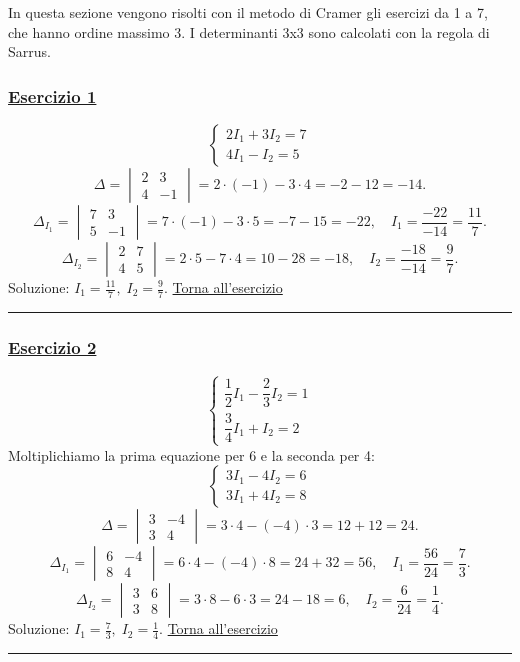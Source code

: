 In questa sezione vengono risolti con il metodo di Cramer gli esercizi da 1 a 7, che hanno ordine massimo 3. I determinanti 3x3 sono calcolati con la regola di Sarrus.

\subsubsection*{\hyperref[ex:1]{Esercizio 1}}
\[
\begin{cases}
2I_1 + 3I_2 = 7 \\
4I_1 - I_2 = 5
\end{cases}
\]
\[
\Delta = \begin{vmatrix} 2 & 3 \\ 4 & -1 \end{vmatrix} = 2\cdot(-1) - 3\cdot4 = -2-12 = -14.
\]
\[
\Delta_{I_1} = \begin{vmatrix} 7 & 3 \\ 5 & -1 \end{vmatrix} = 7\cdot(-1) - 3\cdot5 = -7-15 = -22,\quad I_1 = \frac{-22}{-14} = \frac{11}{7}.
\]
\[
\Delta_{I_2} = \begin{vmatrix} 2 & 7 \\ 4 & 5 \end{vmatrix} = 2\cdot5 - 7\cdot4 = 10-28 = -18,\quad I_2 = \frac{-18}{-14} = \frac{9}{7}.
\]
Soluzione: \(\displaystyle I_1 = \frac{11}{7},\; I_2 = \frac{9}{7}\). \hfill \hyperlink{ex:1}{Torna all'esercizio}\\

\hrule

\subsubsection*{\hyperref[ex:2]{Esercizio 2}}
\[
\begin{cases}
\dfrac{1}{2}I_1 - \dfrac{2}{3}I_2 = 1 \\[6pt]
\dfrac{3}{4}I_1 + I_2 = 2
\end{cases}
\]
Moltiplichiamo la prima equazione per 6 e la seconda per 4:
\[
\begin{cases}
3I_1 - 4I_2 = 6 \\
3I_1 + 4I_2 = 8
\end{cases}
\]
\[
\Delta = \begin{vmatrix} 3 & -4 \\ 3 & 4 \end{vmatrix} = 3\cdot4 - (-4)\cdot3 = 12+12 = 24.
\]
\[
\Delta_{I_1} = \begin{vmatrix} 6 & -4 \\ 8 & 4 \end{vmatrix} = 6\cdot4 - (-4)\cdot8 = 24+32 = 56,\quad I_1 = \frac{56}{24} = \frac{7}{3}.
\]
\[
\Delta_{I_2} = \begin{vmatrix} 3 & 6 \\ 3 & 8 \end{vmatrix} = 3\cdot8 - 6\cdot3 = 24-18 = 6,\quad I_2 = \frac{6}{24} = \frac{1}{4}.
\]
Soluzione: \(\displaystyle I_1 = \frac{7}{3},\; I_2 = \frac{1}{4}\). \hfill \hyperlink{ex:2}{Torna all'esercizio}\\
\hrule

